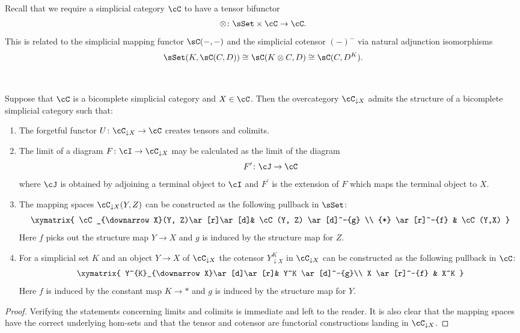 \documentclass[leqno,oneside,english]{elsarticle}
\newcounter{enumisaved}
\newlength{\thmsaved}
\begin{document}
Recall that we require a simplicial category $\cC$ to have a
tensor bifunctor 
\begin{equation*}
  \otimes\colon \sSet \times \cC \rightarrow \cC.
\end{equation*}
This is related to the simplicial mapping functor $\sC(-,-)$ and the
simplicial cotensor $(-)^{-}$ via natural adjunction isomorphisms 
\begin{equation*}\label{eqn:hom-tensor-adjunction}
  \sSet(K,\sC(C,D))\cong \sC(K\otimes C, D)\cong \sC(C,D^{K}).
\end{equation*}
{{    {}  \ifshowcomplete
  \ 
  {
\begin{prop*}\label{prop:simplicial-over-categories}
  Suppose that $\cC$ is a bicomplete simplicial category and $X\in \cC$.
  Then the overcategory $\cC_{\downarrow X}$ admits the structure of a
  bicomplete simplicial category such that:
  \begin{enumerate}
  \item The forgetful functor $U\colon \cC_{\downarrow X}\rightarrow
    \cC$ creates tensors and colimits.
  \item The limit of a diagram $F\colon \cI\rightarrow \cC_{\downarrow
    X}$ may be calculated as the limit of the diagram \[F^{\prime}
    \colon \cJ \rightarrow \cC \] where $\cJ$ is obtained by adjoining a
    terminal object to $\cI$ and $F^{\prime}$ is the extension of $F$
    which maps the terminal object to $X$.
  \item The mapping spaces $\cC_{\downarrow X}(Y,Z)$ can be
    constructed as the following pullback in $\sSet$:
    \[\xymatrix{
    \cC_{\downarrow X}(Y, Z)\ar[r]\ar[d]& \cC(Y, Z) \ar[d]^-{g} \\
    {*} \ar[r]^-{f} & \cC(Y,X)
    }\]
    Here $f$ picks out the structure map $Y\rightarrow X$ and $g$ is
    induced by the structure map for $Z$.
  \item For a simplicial set $K$ and an object $Y\rightarrow X$ of
    $\cC_{\downarrow X}$ the cotensor $Y^{K}_{\downarrow X}$ in
    $\cC_{\downarrow X}$ can be constructed as the following pullback in 
    $\cC$:
    \[\xymatrix{ 
      Y^{K}_{\downarrow X}\ar[d]\ar[r]& Y^K \ar[d]^-{g}\\
      X \ar[r]^-{f} & X^K
    }\]
    Here $f$ is induced by the constant map $K\rightarrow *$ and $g$
    is induced by the structure map for $Y$.
  \end{enumerate}
\end{prop*}
\begin{proof}
  Verifying the statements concerning limits and colimits is immediate
  and left to the reader. It is also clear that the mapping spaces have
  the correct underlying hom-sets and that the tensor and cotensor
  are functorial constructions landing in $\cC_{\downarrow X}$. 
 

\end{proof}}}}
\end{document}
